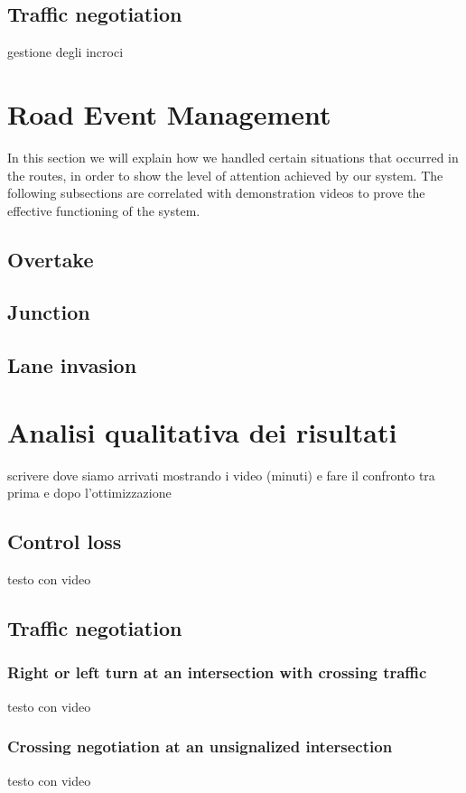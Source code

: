 \documentclass{article}
\begin{document}
\subsection{Traffic negotiation}
gestione degli incroci




\section*{Road Event Management}
In this section we will explain how we handled certain situations that occurred in the routes, 
in order to show the level of attention achieved by our system. The following subsections are 
correlated with demonstration videos to prove the effective functioning of the system.
\subsection*{Overtake}
\subsection*{Junction}
\subsection*{Lane invasion}







\section{Analisi qualitativa dei risultati}
scrivere dove siamo arrivati mostrando i video (minuti) e fare il confronto tra prima e dopo l'ottimizzazione
\subsection{Control loss}
testo con video

\subsection{Traffic negotiation}
\subsubsection{Right or left turn at an intersection with crossing traffic}
testo con video
\subsubsection{Crossing negotiation at an unsignalized intersection}
testo con video
\end{document}
